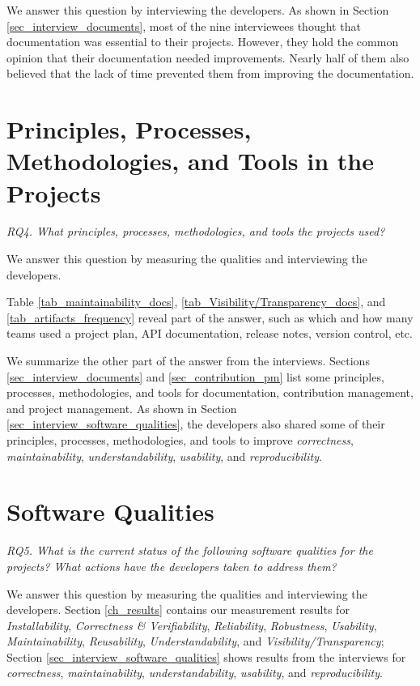 We answer this question by interviewing the developers. As shown in Section \ref{sec_interview_documents}, most of the nine interviewees thought that documentation was essential to their projects. However, they hold the common opinion that their documentation needed improvements. Nearly half of them also believed that the lack of time prevented them from improving the documentation.

\section{Principles, Processes, Methodologies, and Tools in the Projects}
\label{sec_rq4_PPMT}
\textit{RQ4. What principles, processes, methodologies, and tools the projects used?}

We answer this question by measuring the qualities and interviewing the developers.

Table \ref{tab_maintainability_docs}, \ref{tab_Visibility/Transparency_docs}, and \ref{tab_artifacts_frequency} reveal part of the answer, such as which and how many teams used a project plan, API documentation, release notes, version control, etc.

We summarize the other part of the answer from the interviews. Sections \ref{sec_interview_documents} and \ref{sec_contribution_pm} list some principles, processes, methodologies, and tools for documentation, contribution management, and project management. As shown in Section \ref{sec_interview_software_qualities}, the developers also shared some of their principles, processes, methodologies, and tools to improve \textit{correctness}, \textit{maintainability}, \textit{understandability}, \textit{usability}, and \textit{reproducibility}.

\section{Software Qualities}
\label{sec_rq5_qualities}
\textit{RQ5. What is the current status of the following software qualities for the projects? What actions have the developers taken to address them?}

We answer this question by measuring the qualities and interviewing the developers. Section \ref{ch_results} contains our measurement results for \textit{Installability}, \textit{Correctness \& Verifiability}, \textit{Reliability}, \textit{Robustness}, \textit{Usability}, \textit{Maintainability}, \textit{Reusability}, \textit{Understandability}, and \textit{Visibility/Transparency}; Section \ref{sec_interview_software_qualities} shows results from the interviews for \textit{correctness}, \textit{maintainability}, \textit{understandability}, \textit{usability}, and \textit{reproducibility}.

